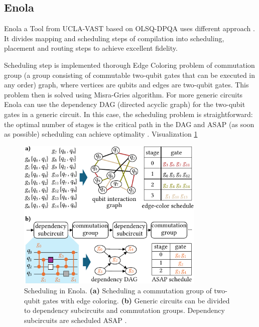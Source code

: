 \subsection{Enola}
Enola a Tool from \ac{UCLA-VAST} based on OLSQ-DPQA uses different approach \parencite{Tan_2025_Enola,Tan_2024}.
It divides mapping and scheduling steps of compilation into scheduling, placement and routing steps to achieve excellent fidelity.

Scheduling step is implemented thorough Edge Coloring problem of commutation group (a group consisting of commutable two-qubit
gates that can be executed in any order) graph, 
where vertices are qubits and edges are two-qubit gates. 
This problem then is solved using Misra-Gries algorithm.
For more generic circuits Enola can use the dependency DAG (directed acyclic graph) for the two-qubit
gates in a generic circuit. In this case, the scheduling problem is
straightforward: the optimal number of stages is the critical path
in the DAG and ASAP (as soon as possible) scheduling can achieve
optimality \parencite{Tan_2025_Enola}. 
Visualization \ref{fig:scheduling_Enola}
\begin{figure}[htbp]
  \centering
    \includegraphics[width=0.8\textwidth]{figures/scheduling_Enola.pdf}
    \caption [Scheduling in Enola]{ Scheduling in Enola. 
    \textbf{(a)} Scheduling a commutation group of two-qubit gates with edge coloring. 
    \textbf{(b)} Generic circuits can be divided to dependency subcircuits and commutation groups. 
    Dependency subcircuits are scheduled ASAP \parencite{Tan_2025_Enola}.}
    \label{fig:scheduling_Enola}
\end{figure}

